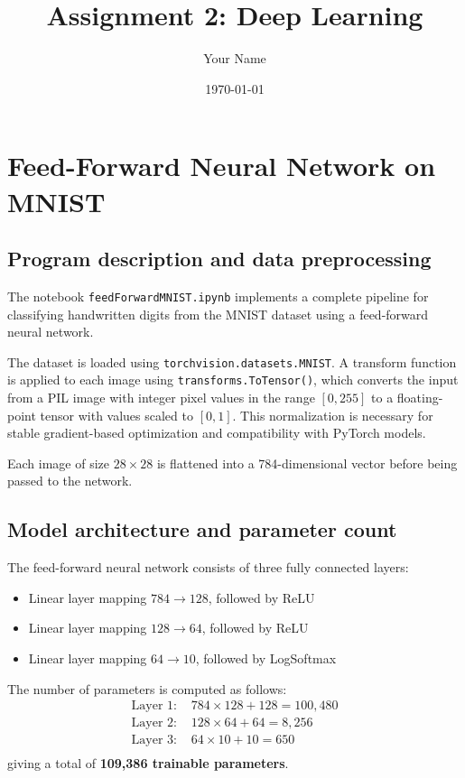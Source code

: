 \documentclass[11pt,a4paper]{article}
\title{Assignment 2: Deep Learning}
\author{Your Name}
\date{\today}
\begin{document}
\maketitle

\section{Feed-Forward Neural Network on MNIST}

\subsection{Program description and data preprocessing}
The notebook \texttt{feedForwardMNIST.ipynb} implements a complete pipeline for classifying handwritten digits from the MNIST dataset using a feed-forward neural network.

The dataset is loaded using \texttt{torchvision.datasets.MNIST}. A transform function is applied to each image using \texttt{transforms.ToTensor()}, which converts the input from a PIL image with integer pixel values in the range $[0,255]$ to a floating-point tensor with values scaled to $[0,1]$. This normalization is necessary for stable gradient-based optimization and compatibility with PyTorch models.

Each image of size $28 \times 28$ is flattened into a 784-dimensional vector before being passed to the network.

\subsection{Model architecture and parameter count}
The feed-forward neural network consists of three fully connected layers:
\begin{itemize}
\item Linear layer mapping $784 \rightarrow 128$, followed by ReLU
\item Linear layer mapping $128 \rightarrow 64$, followed by ReLU
\item Linear layer mapping $64 \rightarrow 10$, followed by LogSoftmax
\end{itemize}

The number of parameters is computed as follows:
\begin{align*}
\text{Layer 1: } & 784 \times 128 + 128 = 100{,}480 \\
\text{Layer 2: } & 128 \times 64 + 64 = 8{,}256 \\
\text{Layer 3: } & 64 \times 10 + 10 = 650 \\
\end{align*}
giving a total of \textbf{109,386 trainable parameters}.
\end{document}
